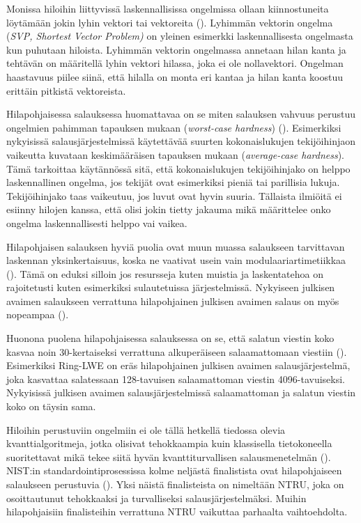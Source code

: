 Monissa hiloihin liittyvissä 
laskennallisissa ongelmissa ollaan kiinnostuneita löytämään jokin lyhin vektori tai vektoreita (\cite{regev2006lattice}). Lyhimmän vektorin ongelma (\emph{SVP, Shortest Vector Problem)} on yleinen esimerkki laskennallisesta ongelmasta kun puhutaan hiloista. Lyhimmän vektorin ongelmassa annetaan hilan kanta ja tehtävän on määritellä lyhin vektori hilassa, joka ei ole nollavektori. Ongelman haastavuus piilee siinä, että hilalla on monta eri kantaa ja hilan kanta koostuu erittäin pitkistä vektoreista.

Hilapohjaisessa salauksessa huomattavaa on se miten salauksen vahvuus perustuu ongelmien pahimman tapauksen mukaan (\emph{worst-case hardness}) (\cite{regev2006lattice}). Esimerkiksi nykyisissä salausjärjestelmissä käytettävää suurten kokonaislukujen tekijöihinjaon vaikeutta kuvataan keskimääräisen tapauksen mukaan (\emph{average-case hardness}). Tämä tarkoittaa käytännössä sitä, että kokonaislukujen tekijöihinjako on helppo laskennallinen ongelma, jos tekijät ovat esimerkiksi pieniä tai parillisia lukuja. Tekijöihinjako taas vaikeutuu, jos luvut ovat hyvin suuria. Tällaista ilmiöitä ei esiinny hilojen kanssa, että olisi jokin tietty jakauma mikä määrittelee onko ongelma laskennallisesti helppo vai vaikea.

Hilapohjaisen salauksen hyviä puolia ovat muun muassa salaukseen tarvittavan laskennan yksinkertaisuus, koska ne vaativat usein vain modulaariartimetiikkaa (\cite{regev2006lattice}). Tämä on eduksi silloin jos resursseja kuten muistia ja laskentatehoa on rajoitetusti kuten esimerkiksi sulautetuissa järjestelmissä. Nykyiseen julkisen avaimen salaukseen verrattuna hilapohjainen julkisen avaimen salaus on myös nopeampaa (\cite{8275352}).

Huonona puolena hilapohjaisessa salauksessa on se, että salatun viestin koko kasvaa noin 30-kertaiseksi verrattuna alkuperäiseen salaamattomaan viestiin (\cite{8275352}). Esimerkiksi Ring-LWE on eräs hilapohjainen julkisen avaimen salausjärjestelmä, joka kasvattaa salatessaan 128-tavuisen salaamattoman viestin 4096-tavuiseksi. Nykyisissä julkisen avaimen salausjärjestelmissä salaamattoman ja salatun viestin koko on täysin sama.

Hiloihin perustuviin ongelmiin ei ole tällä hetkellä tiedossa olevia kvanttialgoritmeja, jotka olisivat tehokkaampia kuin klassisella tietokoneella suoritettavat mikä tekee siitä hyvän kvanttiturvallisen salausmenetelmän (\cite{regev2006lattice}). NIST:in standardointiprosessissa kolme neljästä finalistista ovat hilapohjaiseen salaukseen perustuvia (\cite{alagic2020status}). Yksi näistä finalisteista on nimeltään NTRU, joka on osoittautunut tehokkaaksi ja turvalliseksi salausjärjestelmäksi. Muihin hilapohjaisiin finalisteihin verrattuna NTRU vaikuttaa parhaalta vaihtoehdolta.

